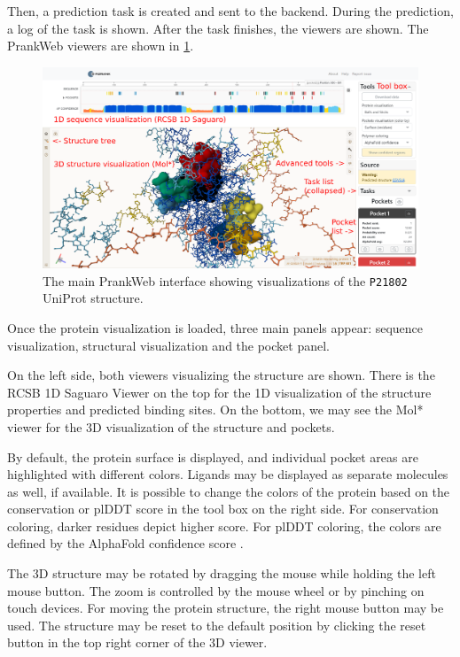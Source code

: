 Then, a prediction task is created and sent to the backend. During the prediction, a log of the task is shown. After the task finishes, the viewers are shown. The PrankWeb viewers are shown in \cref{fig:prankweb_viewers}.

\begin{figure}[ht]
    \centering
    \includegraphics[width=\textwidth]{img/pw_predict.png}
    \caption{The main PrankWeb interface showing visualizations of the \texttt{P21802} UniProt structure.}
    \label{fig:prankweb_viewers}
\end{figure}

Once the protein visualization is loaded, three main panels appear: sequence visualization, structural visualization and the pocket panel.

On the left side, both viewers visualizing the structure are shown. There is the RCSB 1D Saguaro Viewer on the top for the 1D visualization of the structure properties and predicted binding sites. On the bottom, we may see the Mol* viewer for the 3D visualization of the structure and pockets. 

By default, the protein surface is displayed, and individual pocket areas are highlighted with different colors. Ligands may be displayed as separate molecules as well, if available. It is possible to change the colors of the protein based on the conservation or plDDT score in the tool box on the right side. For conservation coloring, darker residues depict higher score. For plDDT coloring, the colors are defined by the AlphaFold confidence score \cite{david2022alphafold}.

The 3D structure may be rotated by dragging the mouse while holding the left mouse button. The zoom is controlled by the mouse wheel or by pinching on touch devices. For moving the protein structure, the right mouse button may be used. The structure may be reset to the default position by clicking the reset button in the top right corner of the 3D viewer.

